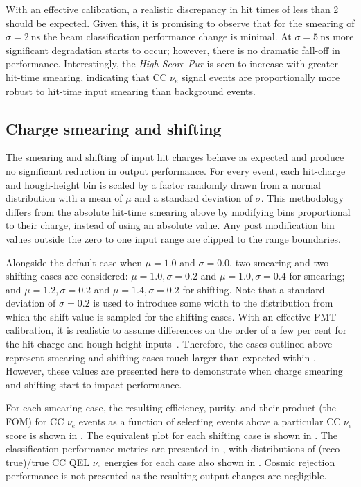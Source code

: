 With an effective calibration, a realistic discrepancy in hit times of less than \SI{2}{}
should be expected. Given this, it is promising to observe that for the smearing of
$\sigma=2~\text{ns}$ the beam classification performance change is minimal. At
$\sigma=5~\text{ns}$ more significant degradation starts to occur; however, there is no dramatic
fall-off in performance. Interestingly, the \emph{High Score Pur} is seen to increase with greater
hit-time smearing, indicating that CC $\nu_{e}$ signal events are proportionally more robust to
hit-time input smearing than background events.

\subsection{Charge smearing and shifting} %
\label{sec:results_robust_charge} %

The smearing and shifting of input hit charges behave as expected and produce no significant
reduction in output performance. For every event, each hit-charge and hough-height bin is scaled
by a factor randomly drawn from a normal distribution with a mean of $\mu$ and a standard
deviation of $\sigma$. This methodology differs from the absolute hit-time smearing above by
modifying bins proportional to their charge, instead of using an absolute value. Any post
modification bin values outside the zero to one input range are clipped to the range boundaries.

Alongside the default case when $\mu=1.0$ and $\sigma=0.0$, two smearing and two shifting cases
are considered: $\mu=1.0,\sigma=0.2$ and $\mu=1.0,\sigma=0.4$ for smearing; and
$\mu=1.2,\sigma=0.2$ and $\mu=1.4,\sigma=0.2$ for shifting. Note that a standard deviation of
$\sigma=0.2$ is used to introduce some width to the distribution from which the shift value is
sampled for the shifting cases. With an effective PMT calibration, it is realistic to assume
differences on the order of a few per cent for the hit-charge and hough-height
inputs~\cite{abe2014}. Therefore, the cases outlined above represent smearing and shifting cases
much larger than expected within \chipsfive. However, these values are presented here to
demonstrate when charge smearing and shifting start to impact performance.

For each smearing case, the resulting efficiency, purity, and their product (the FOM) for CC
$\nu_{e}$ events as a function of selecting events above a particular CC $\nu_{e}$ score is shown
in . The equivalent plot for each shifting case
is shown in . The classification performance
metrics are presented in , with distributions of (reco-true)/true CC
QEL $\nu_{e}$ energies for each case also shown in . Cosmic
rejection performance is not presented as the resulting output changes are negligible.

